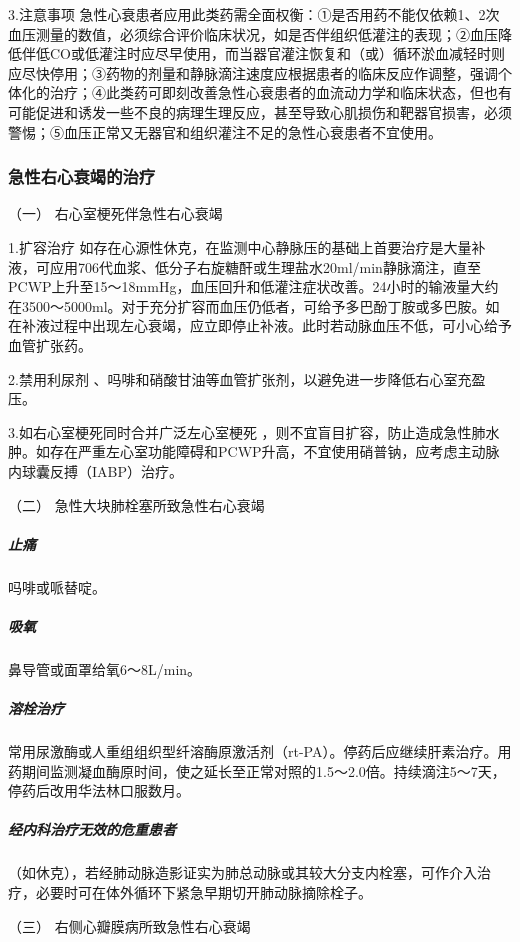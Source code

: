 3.注意事项
急性心衰患者应用此类药需全面权衡：①是否用药不能仅依赖1、2次血压测量的数值，必须综合评价临床状况，如是否伴组织低灌注的表现；②血压降低伴低CO或低灌注时应尽早使用，而当器官灌注恢复和（或）循环淤血减轻时则应尽快停用；③药物的剂量和静脉滴注速度应根据患者的临床反应作调整，强调个体化的治疗；④此类药可即刻改善急性心衰患者的血流动力学和临床状态，但也有可能促进和诱发一些不良的病理生理反应，甚至导致心肌损伤和靶器官损害，必须警惕；⑤血压正常又无器官和组织灌注不足的急性心衰患者不宜使用。

\subsubsection{急性右心衰竭的治疗}

\hypertarget{text00071.htmlux5cux23CHP3-2-5-5-5-1}{}
（一） 右心室梗死伴急性右心衰竭

1.扩容治疗
如存在心源性休克，在监测中心静脉压的基础上首要治疗是大量补液，可应用706代血浆、低分子右旋糖酐或生理盐水20ml/min静脉滴注，直至PCWP上升至15～18mmHg，血压回升和低灌注症状改善。24小时的输液量大约在3500～5000ml。对于充分扩容而血压仍低者，可给予多巴酚丁胺或多巴胺。如在补液过程中出现左心衰竭，应立即停止补液。此时若动脉血压不低，可小心给予血管扩张药。

2.禁用利尿剂
、吗啡和硝酸甘油等血管扩张剂，以避免进一步降低右心室充盈压。

3.如右心室梗死同时合并广泛左心室梗死
，则不宜盲目扩容，防止造成急性肺水肿。如存在严重左心室功能障碍和PCWP升高，不宜使用硝普钠，应考虑主动脉内球囊反搏（IABP）治疗。

\hypertarget{text00071.htmlux5cux23CHP3-2-5-5-5-2}{}
（二） 急性大块肺栓塞所致急性右心衰竭

\subparagraph{止痛}

吗啡或哌替啶。

\subparagraph{吸氧}

鼻导管或面罩给氧6～8L/min。

\subparagraph{溶栓治疗}

常用尿激酶或人重组组织型纤溶酶原激活剂（rt-PA）。停药后应继续肝素治疗。用药期间监测凝血酶原时间，使之延长至正常对照的1.5～2.0倍。持续滴注5～7天，停药后改用华法林口服数月。

\subparagraph{经内科治疗无效的危重患者}

（如休克），若经肺动脉造影证实为肺总动脉或其较大分支内栓塞，可作介入治疗，必要时可在体外循环下紧急早期切开肺动脉摘除栓子。

\hypertarget{text00071.htmlux5cux23CHP3-2-5-5-5-3}{}
（三） 右侧心瓣膜病所致急性右心衰竭

